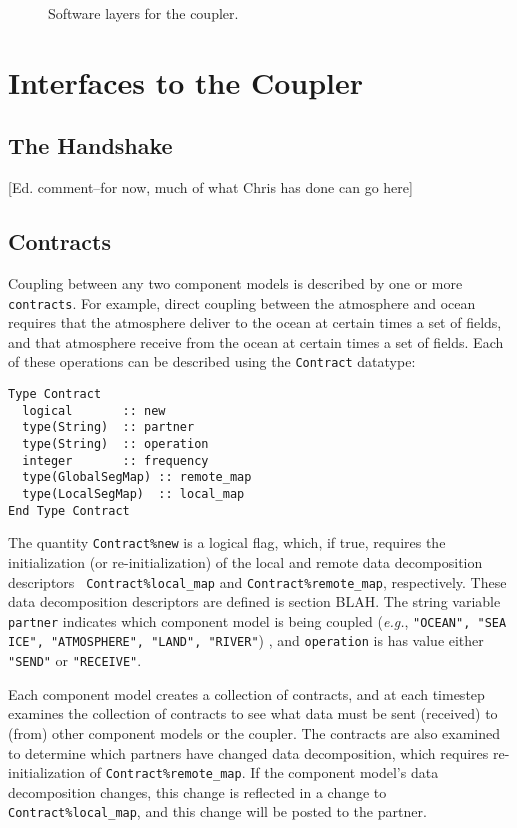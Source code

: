 \documentclass{article}
\begin{document}
\begin{figure}
\epsfxsize=6.0in
\centerline{ }
\caption{Software layers for the coupler.}
\label{fig:coupler-layers}
\end{figure}

\section{Interfaces to the Coupler}

\subsection{The Handshake}

[Ed. comment--for now, much of what Chris has done can go here]

\subsection{Contracts}

Coupling between any two component models is described by one or
more {\tt contracts}.  For example, direct coupling between the
atmosphere and ocean requires that the atmosphere deliver to the
ocean at certain times a set of fields, and that atmosphere
receive from the ocean at certain times a set of fields.  Each of
these operations can be described using the {\tt Contract}
datatype:

\begin{verbatim}
Type Contract
  logical       :: new
  type(String)  :: partner
  type(String)  :: operation
  integer       :: frequency
  type(GlobalSegMap) :: remote_map
  type(LocalSegMap)  :: local_map
End Type Contract
\end{verbatim}

The quantity {\tt Contract\%new} is a logical flag, which, if
true, requires the initialization (or re-initialization) of the
local and remote data decomposition descriptors {\tt
Contract\%local\_map} and {\tt Contract\%remote\_map},
respectively. These data decomposition descriptors are defined is
section BLAH.  The string variable {\tt partner} indicates which
component model is being coupled ({\em e.g.}, {\tt "OCEAN", "SEA
ICE", "ATMOSPHERE", "LAND", "RIVER"}) , and {\tt operation} is
has value either {\tt "SEND"} or {\tt "RECEIVE"}.

Each component model creates a collection of contracts, and at
each timestep examines the collection of contracts to see what
data must be sent (received) to (from) other component models or
the coupler.  The contracts are also examined to determine which
partners have changed data decomposition, which requires
re-initialization of {\tt Contract\%remote\_map}.  If the
component model's data decomposition changes, this change is
reflected in a change to {\tt Contract\%local\_map}, and this
change will be posted to the partner.
\end{document}
